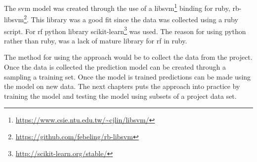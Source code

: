 The \gls{svm} model was created through the use of a libsvm\footnote{\url{https://www.csie.ntu.edu.tw/~cjlin/libsvm/}} binding for ruby, rb-libsvm\footnote{\url{https://github.com/febeling/rb-libsvm}}. This library was a good fit since the data was collected using a ruby script. For \gls{rf} python library scikit-learn\footnote{\url{http://scikit-learn.org/stable/}} was used. The reason for using python rather than ruby, was a lack of mature library for \gls{rf} in ruby.

The method for using the approach would be to collect the data from the project. Once the data is collected the prediction model can be created through a sampling a training set. Once the model is trained predictions can be made using the model on new data. The next chapters puts the approach into practice by training the model and testing the model using subsets of a project data set.